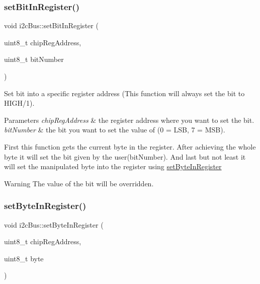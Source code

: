 \subsubsection{\texorpdfstring{set\+Bit\+In\+Register()}{setBitInRegister()}}
{\footnotesize\ttfamily void i2c\+Bus\+::set\+Bit\+In\+Register (\begin{DoxyParamCaption}\item[{uint8\+\_\+t}]{chip\+Reg\+Address,  }\item[{uint8\+\_\+t}]{bit\+Number }\end{DoxyParamCaption})}



Set bit into a specific register address (This function will always set the bit to H\+I\+G\+H/1). 


\begin{DoxyParams}{Parameters}
{\em chip\+Reg\+Address} & the register address where you want to set the bit. \\
\hline
{\em bit\+Number} & the bit you want to set the value of (0 = L\+SB, 7 = M\+SB).\\
\hline
\end{DoxyParams}
First this function gets the current byte in the register. After achieving the whole byte it will set the bit given by the user(bit\+Number). And last but not least it will set the manipulated byte into the register using \mbox{\hyperlink{classi2c_bus_a8bed9bf37dee74b691ab4c92723dd206}{set\+Byte\+In\+Register}} \begin{DoxyWarning}{Warning}
The value of the bit will be overridden. 
\end{DoxyWarning}
\mbox{\label{classi2c_bus_a8bed9bf37dee74b691ab4c92723dd206}} 
\subsubsection{\texorpdfstring{set\+Byte\+In\+Register()}{setByteInRegister()}}
{\footnotesize\ttfamily void i2c\+Bus\+::set\+Byte\+In\+Register (\begin{DoxyParamCaption}\item[{uint8\+\_\+t}]{chip\+Reg\+Address,  }\item[{uint8\+\_\+t}]{byte }\end{DoxyParamCaption})}




